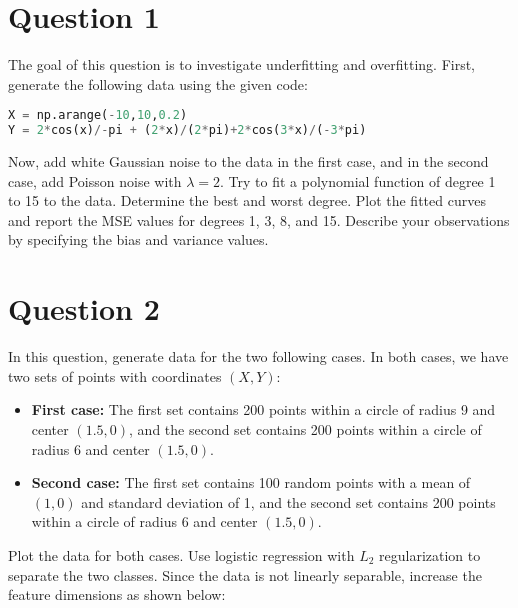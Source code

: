 \documentclass[12pt]{article}
\begin{document}
\setlength{\fboxrule}{.5mm}\setlength{\fboxsep}{1.2mm}
\newlength{\boxlength}\setlength{\boxlength}{\textwidth}
\addtolength{\boxlength}{-4mm}
\begin{center}\end{center}
\vspace{5mm}

\section*{Question 1}

The goal of this question is to investigate underfitting and overfitting. 
First, generate the following data using the given code:

\begin{lstlisting}[language=Python]
X = np.arange(-10,10,0.2)
Y = 2*cos(x)/-pi + (2*x)/(2*pi)+2*cos(3*x)/(-3*pi)
\end{lstlisting}

Now, add white Gaussian noise to the data in the first case, and in the second case, 
add Poisson noise with $\lambda = 2$. Try to fit a polynomial function of degree 1 to 15 
to the data. Determine the best and worst degree. Plot the fitted curves and report the 
MSE values for degrees 1, 3, 8, and 15. Describe your observations by specifying the bias 
and variance values.

\section*{Question 2}

In this question, generate data for the two following cases. In both cases, we have two sets 
of points with coordinates $(X, Y)$:

\begin{itemize}
    \item \textbf{First case:} The first set contains 200 points within a circle of radius 9 
    and center $(1.5, 0)$, and the second set contains 200 points within a circle of radius 6 
    and center $(1.5, 0)$.
    \item \textbf{Second case:} The first set contains 100 random points with a mean of $(1, 0)$ 
    and standard deviation of 1, and the second set contains 200 points within a circle of radius 
    6 and center $(1.5, 0)$.
\end{itemize}

Plot the data for both cases. Use logistic regression with $L_2$ regularization to separate the two classes. 
Since the data is not linearly separable, increase the feature dimensions as shown below:
\end{document}
